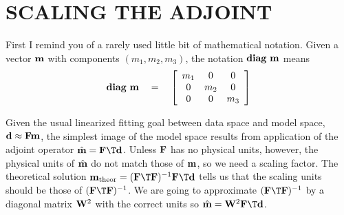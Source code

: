 
\section{SCALING THE ADJOINT}

First I remind you of a rarely used little bit of mathematical notation.
Given a vector $\bold m$ with components $(m_1,m_2,m_3)$,
the notation $ {\bf diag\ }\bold m$ means
\begin{equation}
 {\bf diag\ }\bold m \quad =\quad
	\left[
 	\begin{array}{ccc}
		m_1 &  0 & 0 
		\\
		0   &m_2 & 0
		\\
		0   &  0 & m_3
	\end{array}
	\right]
\end{equation}
\par
Given the usual linearized fitting goal between
data space and model space, $ \bold d \approx \bold F \bold m$,
the simplest image of the model space results from
application of the adjoint operator $ \hat{\bold m} = \bold F\T \bold d$.
Unless $\bold F$ has no physical units, however,
the physical units of $\hat{\bold m}$ do not match those of $\bold m$,
so we need a scaling factor.
The theoretical solution
$\bold m_{\rm theor} = (\bold F\T\bold F)^{-1}\bold F\T\bold d$
tells us that the scaling units should be those of $(\bold F\T\bold F)^{-1}$.
We are going to approximate $(\bold F\T\bold F)^{-1}$ by a diagonal matrix
$\bold W^2$ with the correct units so
$\hat{\bold m} = \bold W^2 \bold F\T\bold d$.

